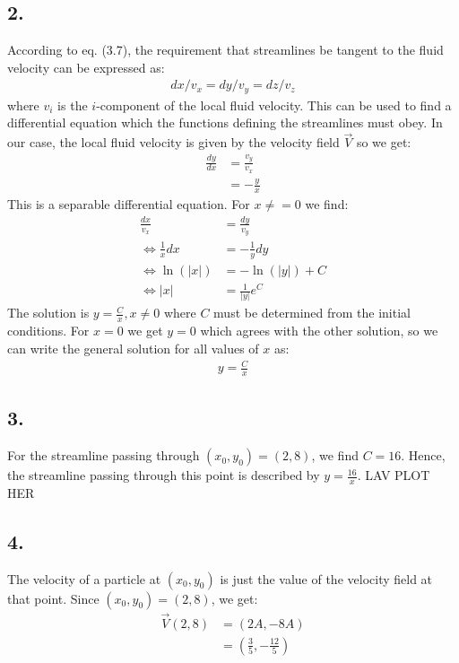\documentclass[a4paper, 12pt]{article}
\begin{document}
\subsection*{2.}

According to eq. (3.7), the requirement that streamlines be tangent to the fluid velocity can be expressed as:
\begin{align*}
	dx/v_x = dy/v_y = dz/v_z
\end{align*}
where $v_i$ is the $i$-component of the local fluid velocity. This can be used to find a differential equation which the functions defining the streamlines must obey. In our case, the local fluid velocity is given by the velocity field $\vec{V}$ so we get:
\begin{align*}
	\frac{dy}{dx} &= \frac{v_y}{v_x} \\
	&= - \frac{y}{x}
\end{align*}
This is a separable differential equation. For $x \neq = 0$ we find:
\begin{align*}
	\frac{dx}{v_x} &= \frac{dy}{v_y} \\
	\Leftrightarrow \frac{1}{x}dx &= - \frac{1}{y	}dy \\
	\Leftrightarrow \ln(|x|) &= - \ln(|y|) + C \\
	\Leftrightarrow |x| &= \frac{1}{|y|} e^C
\end{align*}
The solution is $y = \frac{C}{x}, x \neq 0$ where $C$ must be determined from the initial conditions. For $x=0$ we get $y=0$ which agrees with the other solution, so we can write the general solution for all values of $x$ as:
\begin{align*}
	y = \frac{C}{x}
\end{align*}

\subsection*{3.}
For the streamline passing through $(x_0, y_0) = (2,8)$, we find $C = 16$. Hence, the streamline passing through this point is described by $y = \frac{16}{x}$. LAV PLOT HER

\subsection*{4.}
The velocity of a particle at $(x_0,y_0)$ is just the value of the velocity field at that point. Since $(x_0, y_0) = (2,8)$, we get:
\begin{align*}
	\vec{V}(2,8) &= (2A, - 8A) \\
	&= \left( \frac{3}{5}, - \frac{12}{5} \right)
\end{align*}
\end{document}
